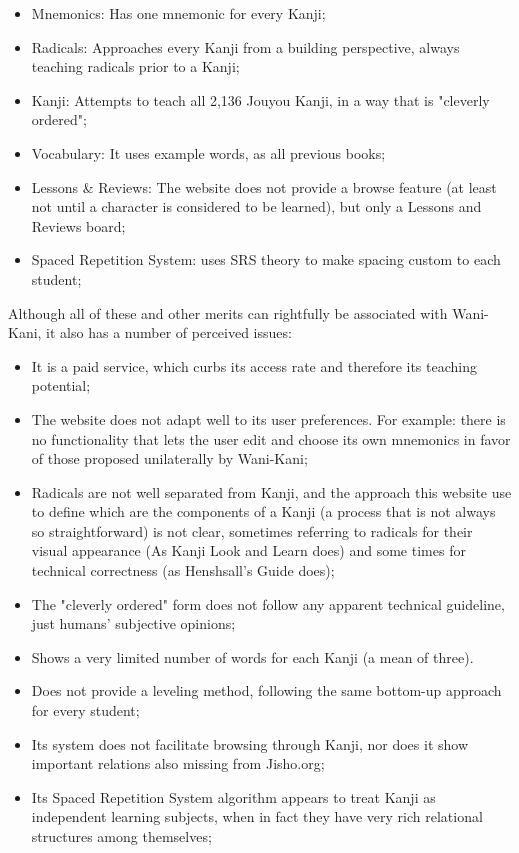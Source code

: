 \begin{itemize}
    \item Mnemonics: Has one mnemonic for every Kanji;
    \item Radicals: Approaches every Kanji from a building perspective, always teaching radicals prior to a Kanji;
    \item Kanji: Attempts to teach all 2,136 Jouyou Kanji, in a way that is "cleverly ordered";
    \item Vocabulary: It uses example words, as all previous books;
    \item Lessons \& Reviews: The website does not provide a browse feature (at least not until a character is considered to be learned), but only a Lessons and Reviews board;
    \item Spaced Repetition System: uses SRS theory\cite{baturay2009effects} to make spacing custom to each student;
\end{itemize}

Although all of these and other merits can rightfully be associated with Wani-Kani, it also has a number of perceived issues:

\begin{itemize}
    \item It is a paid service, which curbs its access rate and therefore its teaching potential;
    \item The website does not adapt well to its user preferences. For example: there is no functionality that lets the user edit and choose its own mnemonics in favor of those proposed unilaterally by Wani-Kani;
    \item Radicals are not well separated from Kanji, and the approach this website use to define which are the components of a Kanji (a process that is not always so straightforward) is not clear, sometimes referring to radicals for their visual appearance (As Kanji Look and Learn does) and some times for technical correctness (as Henshsall's Guide does);
    \item The "cleverly ordered" form does not follow any apparent technical guideline, just humans' subjective opinions;
    \item Shows a very limited number of words for each Kanji (a mean of three).
    \item Does not provide a leveling method, following the same bottom-up approach for every student;
    \item Its system does not facilitate browsing through Kanji, nor does it show important relations also missing from Jisho.org;
    \item Its Spaced Repetition System algorithm appears to treat Kanji as independent learning subjects, when in fact they have very rich relational structures among themselves;
\end{itemize}


